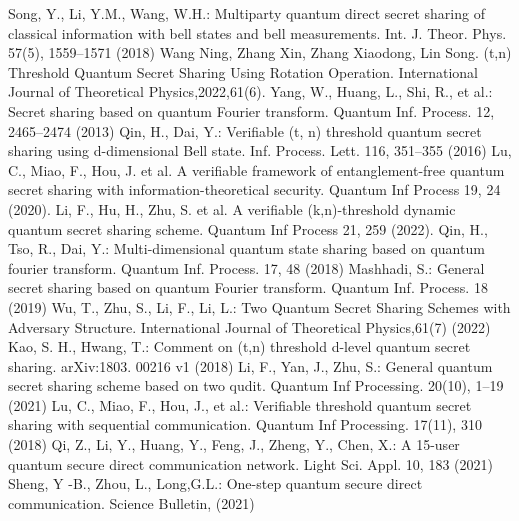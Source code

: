\documentclass[pdflatex,sn-mathphys]{sn-jnl}%
\theoremstyle{thmstyleone}%
\theoremstyle{thmstyletwo}%
\theoremstyle{thmstylethree}%
\begin{document}
\begin{appendices}
\begin{thebibliography}{999}
	Song, Y., Li, Y.M., Wang, W.H.: Multiparty quantum direct secret sharing of classical information with bell states and bell measurements. Int. J. Theor. Phys. 57(5), 1559–1571 (2018)
		Wang Ning, Zhang Xin, Zhang Xiaodong, Lin Song. (t,n) Threshold Quantum Secret Sharing Using Rotation Operation. International Journal of Theoretical Physics,2022,61(6).
	Yang, W., Huang, L., Shi, R., et al.: Secret sharing based on quantum Fourier transform. Quantum Inf. Process. 12, 2465–2474 (2013)
	Qin, H., Dai, Y.: Verifiable (t, n) threshold quantum secret sharing using d-dimensional Bell state. Inf. Process. Lett. 116, 351–355 (2016)
	Lu, C., Miao, F., Hou, J. et al. A verifiable framework of entanglement-free quantum secret sharing with information-theoretical security. Quantum Inf Process 19, 24 (2020).
	Li, F., Hu, H., Zhu, S. et al. A verifiable (k,n)-threshold dynamic quantum secret sharing scheme. Quantum Inf Process 21, 259 (2022).
		Qin, H., Tso, R., Dai, Y.: Multi-dimensional quantum state sharing based on quantum fourier transform. Quantum Inf. Process. 17, 48 (2018)
	Mashhadi, S.: General secret sharing based on quantum Fourier transform. Quantum Inf. Process. 18 (2019)
	Wu, T., Zhu, S., Li, F., Li, L.: Two Quantum Secret Sharing Schemes with Adversary Structure. International Journal of Theoretical Physics,61(7) (2022)
	Kao, S. H., Hwang, T.: Comment on (t,n) threshold d-level quantum secret sharing. arXiv:1803. 00216 v1 (2018)
	Li, F., Yan, J., Zhu, S.: General quantum secret sharing scheme based on two qudit. Quantum Inf Processing. 20(10), 1–19 (2021)
	Lu, C., Miao, F., Hou, J., et al.: Verifiable threshold quantum secret sharing with sequential communication. Quantum Inf Processing. 17(11), 310 (2018)
	Qi, Z., Li, Y., Huang, Y., Feng, J., Zheng, Y., Chen, X.: A 15-user quantum secure direct communication network. Light Sci. Appl. 10, 183 (2021)
	Sheng, Y -B., Zhou, L., Long,G.L.: One-step quantum secure direct communication. Science Bulletin, (2021)

\end{thebibliography}
\end{appendices}
\end{document}
